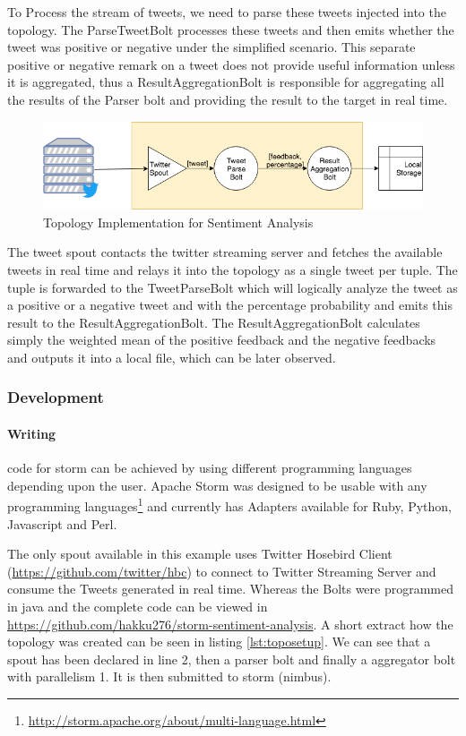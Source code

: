\documentclass[runningheads,a4paper]{llncs}[2015/06/24]
\begin{document}
To Process the stream of tweets, we need to parse these tweets injected into the topology. The ParseTweetBolt processes these tweets and then emits whether the tweet was positive or negative under the simplified scenario. This separate positive or negative remark on a tweet does not provide useful information unless it is aggregated, thus a ResultAggregationBolt is responsible for aggregating all the results of the Parser bolt and providing the result to the target in real time.

\begin{figure}
  \begin{center}
    \includegraphics[width=.7\textwidth]{topoimpl.png}
    \caption{Topology Implementation for Sentiment Analysis}
    \label{fig:topoimpl}
   \end{center}
\end{figure}

The tweet spout contacts the twitter streaming server and fetches the available tweets in real time and relays it into the topology as a single tweet per tuple. The tuple is forwarded to the TweetParseBolt which will logically analyze the tweet as a positive or a negative tweet and with the percentage probability and emits this result to the ResultAggregationBolt. The ResultAggregationBolt calculates simply the weighted mean of the positive feedback and the negative feedbacks and outputs it into a local file, which can be later observed.

\subsubsection{Development}
\paragraph{Writing} code for storm can be achieved by using different programming languages depending upon the user. Apache Storm was designed to be usable with any programming languages\footnote{\url{http://storm.apache.org/about/multi-language.html}} and currently has Adapters available for Ruby, Python, Javascript and Perl.

The only spout available in this example uses Twitter Hosebird Client (\url{https://github.com/twitter/hbc}) to connect to Twitter Streaming Server and consume the Tweets generated in real time. Whereas the Bolts were programmed in java and the complete code can be viewed in \url{https://github.com/hakku276/storm-sentiment-analysis}. A short extract how the topology was created can be seen in listing  \ref{lst:toposetup}. We can see that a spout has been declared in line 2, then a parser bolt and finally a aggregator bolt with parallelism 1. It is then submitted to storm (nimbus).
\end{document}
